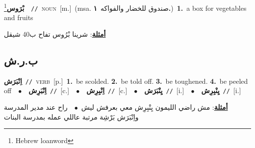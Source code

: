 \documentclass[10pt,a4paper,twoside]{article} %
\begin{document}
\begin{multicols}{2}
{\setlength\topsep{0pt}\textbf{\foreignlanguage{arabic}{بْرَوس}}\footnote{Hebrew loanword}\ \ {\color{gray}\texttt{//}\color{black}}\ \textsc{noun}\ [m.]\ \color{gray}(msa. \foreignlanguage{arabic}{صندوق للخضار والفواكه}~\foreignlanguage{arabic}{\textbf{١.}})\color{black}\ \textbf{1.}~a box for vegetables and fruits\  \begin{flushright}\color{gray}\foreignlanguage{arabic}{\textbf{\underline{\foreignlanguage{arabic}{أمثلة}}}: شرينا بْرُوس تفاح ب40 شيقل}\end{flushright}\color{black}} \vspace{2mm}

\vspace{-3mm}
\subsection*{\color{blue}\foreignlanguage{arabic}{ب.ر.ش}\color{blue}{}} 

{\setlength\topsep{0pt}\textbf{\foreignlanguage{arabic}{اِنْبَرَش}}\ {\color{gray}\texttt{//}\color{black}}\ \textsc{verb}\ [p.]\ \textbf{1.}~be scolded.  \textbf{2.}~be told off.  \textbf{3.}~be toughened.  \textbf{4.}~be peeled off\ \ $\bullet$\ \ \setlength\topsep{0pt}\textbf{\foreignlanguage{arabic}{اِنْبَرِش}}\ {\color{gray}\texttt{//}\color{black}}\ [c.]\ \ $\bullet$\ \ \setlength\topsep{0pt}\textbf{\foreignlanguage{arabic}{اِنْبِرِش}}\ {\color{gray}\texttt{//}\color{black}}\ [c.]\ \ $\bullet$\ \ \setlength\topsep{0pt}\textbf{\foreignlanguage{arabic}{يِنْبَرَش}}\ {\color{gray}\texttt{//}\color{black}}\ [i.]\ \ $\bullet$\ \ \setlength\topsep{0pt}\textbf{\foreignlanguage{arabic}{يِنْبِرِش}}\ {\color{gray}\texttt{//}\color{black}}\ [i.]\  \begin{flushright}\color{gray}\foreignlanguage{arabic}{\textbf{\underline{\foreignlanguage{arabic}{أمثلة}}}: مش راضي الليمون يِنْبِرِش معي بعرفش ليش\ $\bullet$\ \  راح عند مدير المدرسة واِنْبَرَش بَرْشِة مرتبة عاللي عمله بمدرسة البنات}\end{flushright}\color{black}} \vspace{2mm}


\end{multicols}
\end{document}
